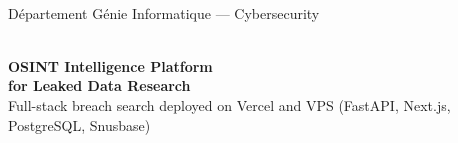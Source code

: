 
\begin{titlepage}
\thispagestyle{empty}
\pagecolor{white}


\noindent
\begin{minipage}[t]{0.42\textwidth}
  \vspace{0pt}
  \iteamlogo
\end{minipage}%
\hfill
\begin{minipage}[t]{0.52\textwidth}
  \vspace{0pt}
  \raggedleft
  \setlength{\fboxsep}{6pt}
  \\[6pt]
  {\scriptsize Département Génie Informatique --- Cybersecurity}
\end{minipage}

\vspace{0.55cm}
\noindent{\color{CoverRed}\rule{\textwidth}{0.8pt}}

\vspace{1.4cm}

\noindent\hspace{1.15cm}%
\begin{minipage}[t]{0.88\textwidth}
  {\fontsize{46}{50}\selectfont\bfseries\rmfamily \leaklens{}}\\[0.55cm]
  {\Large\color{CoverRed}\bfseries
    OSINT Intelligence Platform\\[0.12cm]
    for Leaked Data Research}\\[0.45cm]
  {\normalsize
    Full-stack breach search deployed on Vercel and VPS
    (FastAPI, Next.js, PostgreSQL, Snusbase)}\\[1.4cm]
  \setlength{\fboxsep}{8pt}
\end{minipage}


\end{titlepage}
